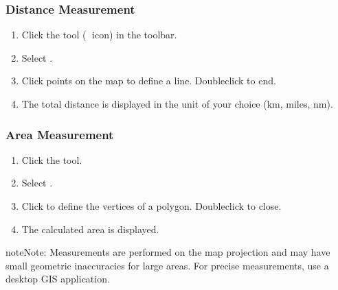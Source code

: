 \documentclass[letterpaper,10pt,english]{sphinxmanual}
\begin{document}
\subsubsection{Distance Measurement}
\label{\detokenize{en/04_exploring_maps:distance-measurement}}\begin{enumerate}
%
\item {} 
\sphinxAtStartPar
Click the  tool (📐 icon) in the toolbar.

\item {} 
\sphinxAtStartPar
Select .

\item {} 
\sphinxAtStartPar
Click points on the map to define a line. Double\sphinxhyphen{}click to end.

\item {} 
\sphinxAtStartPar
The total distance is displayed in the unit of your choice (km, miles, nm).

\end{enumerate}


\subsubsection{Area Measurement}
\label{\detokenize{en/04_exploring_maps:area-measurement}}\begin{enumerate}
%
\item {} 
\sphinxAtStartPar
Click the  tool.

\item {} 
\sphinxAtStartPar
Select .

\item {} 
\sphinxAtStartPar
Click to define the vertices of a polygon. Double\sphinxhyphen{}click to close.

\item {} 
\sphinxAtStartPar
The calculated area is displayed.

\end{enumerate}

\begin{sphinxadmonition}{note}{Note:}
\sphinxAtStartPar
Measurements are performed on the map projection and may have small geometric
inaccuracies for large areas. For precise measurements, use a desktop GIS application.
\end{sphinxadmonition}
\end{document}
